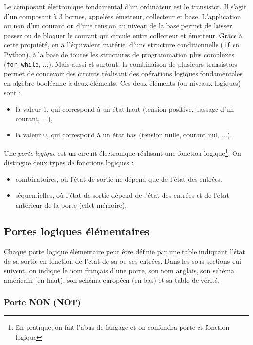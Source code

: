 \documentclass[11pt,a4paper,french,twoside]{PMCours}
\begin{document}
Le composant électronique fondamental d'un ordinateur est le transistor. Il s'agit d'un composant à 3 bornes, appelées émetteur, collecteur et base. L'application ou non d'un courant ou d'une tension au niveau de la base permet de laisser passer ou de bloquer le courant qui circule entre collecteur et émetteur. Grâce à cette propriété, on a l'équivalent matériel d'une structure conditionnelle (\verb'if' en Python), à la base de toutes les structures de programmation plus complexes (\verb'for', \verb'while', ...). Mais aussi et surtout, la combinaison de plusieurs transistors permet de concevoir des circuits réalisant des opérations logiques fondamentales en algèbre booléenne à deux éléments. Ces deux éléments (ou niveaux logiques) sont :
\begin{itemize}
 \item la valeur 1, qui correspond à un état haut (tension positive, passage d'un courant, ...),
 \item la valeur 0, qui correspond à un état bas (tension nulle, courant nul, ...).
\end{itemize}
\begin{Definition}{}
Une \emph{porte logique} est un circuit électronique réalisant une fonction logique\footnote{En pratique, on fait l'abus de langage et on  confondra porte et fonction logique}. On distingue deux types de fonctions logiques : 
\begin{itemize}
 \item combinatoires, où l'état de sortie ne dépend que de l'état des entrées.
 \item séquentielles, où l'état de sortie dépend de l'état des entrées et de l'état antérieur de la porte (effet mémoire).
\end{itemize}
\end{Definition}



\subsection{Portes logiques élémentaires}

Chaque porte logique élémentaire peut être définie par une table indiquant l'état de sa sortie en fonction de l'état de sa ou ses entrées. Dans les sous-sections qui suivent, on indique le nom français d'une porte, son nom anglais, son schéma américain (en haut), son schéma européen (en bas) et sa table de vérité.

\subsubsection{Porte NON (NOT)}
\end{document}
